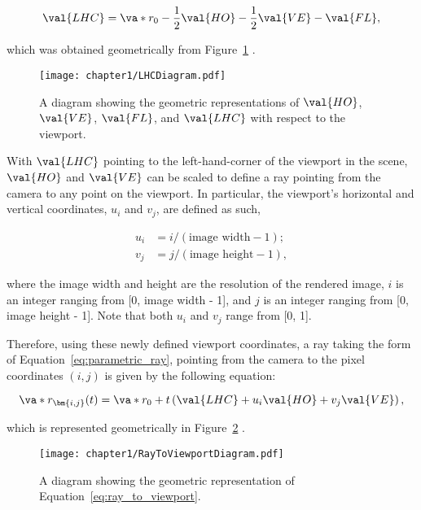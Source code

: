 \begin{equation}
  \val{LHC} = \va*{r_0} - \frac{1}{2}\val{HO} - \frac{1}{2}\val{VE} - \val{FL},
  \label{eq:LHC}
\end{equation}

\noindent which was obtained geometrically from Figure~\ref{fig:LHC_diagram} \cite{Shirley}.

\begin{figure}[H]
    \centering
	\texttt{[image: chapter1/LHCDiagram.pdf]}
	\caption{A diagram showing the geometric representations of $\protect\val{HO}$, $\protect\val{VE}$,
   $\protect\val{FL}$, and $\protect\val{LHC}$ with respect to the viewport.}
	\label{fig:LHC_diagram}
\end{figure}

\par With $\val{LHC}$ pointing to the left-hand-corner of the viewport in the scene, $\val{HO}$ and $\val{VE}$ can be scaled to define a ray pointing from the camera to any point on the viewport. In particular,  the viewport's horizontal and vertical coordinates, $u_i$ and $v_j$, are defined as such,

\begin{align}
u_i &= i/(\text{image width} - 1);\\
v_j &= j/(\text{image height} - 1),
\label{eq:viewport_coords}
\end{align}

\noindent where the image width and height are the resolution of the rendered image, $i$ is an integer ranging from [0, image width - 1], and $j$ is an integer ranging from [0, image height - 1]. Note that both $u_i$ and $v_j$ range from [0, 1].

\par Therefore, using these newly defined viewport coordinates, a ray taking the form of Equation~\ref{eq:parametric_ray}, pointing from the camera to the pixel coordinates $(i, j)$ is given by the following equation:

\begin{equation}
  \va*{r}_{\bm{i,j}}(t) = \va*{r_0} + t \left( \val{LHC} + u_i \val{HO}  + v_j \val{VE} \right),
  \label{eq:ray_to_viewport}
\end{equation}

\noindent which is represented geometrically in Figure~\ref{fig:ray_to_viewport_diagram} \cite{Shirley}.

\begin{figure}[H]
  \centering
\texttt{[image: chapter1/RayToViewportDiagram.pdf]}
\caption{A diagram showing the geometric representation of Equation~\ref{eq:ray_to_viewport}.}
\label{fig:ray_to_viewport_diagram}
\end{figure}

